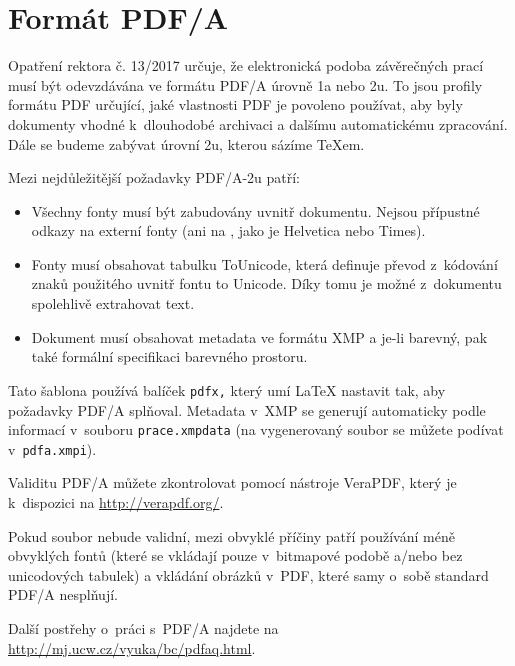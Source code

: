 \chapter{Formát PDF/A}

Opatření rektora č. 13/2017 určuje, že elektronická podoba závěrečných
prací musí být odevzdávána ve formátu PDF/A úrovně 1a nebo 2u. To jsou
profily formátu PDF určující, jaké vlastnosti PDF je povoleno používat,
aby byly dokumenty vhodné k~dlouhodobé archivaci a dalšímu automatickému
zpracování. Dále se budeme zabývat úrovní 2u, kterou sázíme \TeX{}em.

Mezi nejdůležitější požadavky PDF/A-2u patří:

\begin{itemize}

\item Všechny fonty musí být zabudovány uvnitř dokumentu. Nejsou přípustné
odkazy na externí fonty (ani na , jako je Helvetica nebo Times).

\item Fonty musí obsahovat tabulku ToUnicode, která definuje převod z~kódování
znaků použitého uvnitř fontu to Unicode. Díky tomu je možné z~dokumentu
spolehlivě extrahovat text.

\item Dokument musí obsahovat metadata ve formátu XMP a je-li barevný,
pak také formální specifikaci barevného prostoru.

\end{itemize}

Tato šablona používá balíček {\tt pdfx,} který umí \LaTeX{} nastavit tak,
aby požadavky PDF/A splňoval. Metadata v~XMP se generují automaticky podle
informací v~souboru {\tt prace.xmpdata} (na vygenerovaný soubor se můžete
podívat v~{\tt pdfa.xmpi}).

Validitu PDF/A můžete zkontrolovat pomocí nástroje VeraPDF, který je
k~dispozici na \url{http://verapdf.org/}.

Pokud soubor nebude validní, mezi obvyklé příčiny patří používání méně
obvyklých fontů (které se vkládají pouze v~bitmapové podobě a/nebo bez
unicodových tabulek) a vkládání obrázků v~PDF, které samy o~sobě standard
PDF/A nesplňují.

Další postřehy o~práci s~PDF/A najdete na \url{http://mj.ucw.cz/vyuka/bc/pdfaq.html}.
